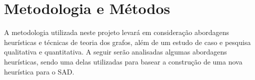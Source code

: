 \section{Metodologia e Métodos}

A metodologia utilizada neste projeto levará em consideração abordagens heurísticas e técnicas de teoria dos grafos, além de um estudo de caso e pesquisa qualitativa e quantitativa.
A seguir serão analisadas algumas abordagens heurísticas, sendo uma delas utilizadas para basear a construção de uma nova heurística para o \ac{SAD}. 





